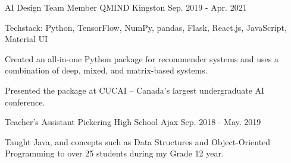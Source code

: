 \begin{cventries}
  \cventry
    {AI Design Team Member} %
    {QMIND} %
    {Kingston} %
    {Sep. 2019 - Apr. 2021} %
    {
      \begin{cvitems} %
        \item {Techstack: Python, TensorFlow, NumPy, pandas, Flask, React.js, JavaScript, Material UI}
        \item {Created an all-in-one Python package for recommender systems and uses a combination of deep, mixed, and matrix-based systems.}
        \item {Presented the package at CUCAI – Canada’s largest undergraduate AI conference.}
      \end{cvitems}
    }
    
  \cventry
    {Teacher's Assistant} %
    {Pickering High School} %
    {Ajax} %
    {Sep. 2018 - May. 2019} %
    {
      \begin{cvitems} %
        \item {Taught Java, and concepts such as Data Structures and Object-Oriented Programming to over 25 students during my Grade 12 year.}
      \end{cvitems}
    }


\end{cventries}
